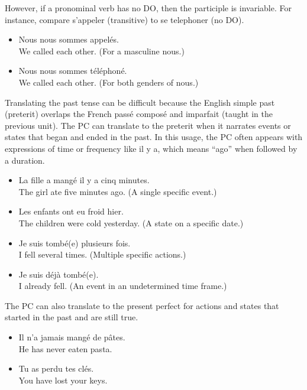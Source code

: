 However, if a pronominal verb has no DO, then the participle is invariable. For instance, compare s'appeler (transitive) to se telephoner (no DO).

\begin{itemize}
  \item  Nous nous sommes appel{\'e}s. \\ We called each other. (For a masculine nous.)
	\item  Nous nous sommes t{\'e}l{\'e}phon{\'e}. \\ We called each other. (For both genders of nous.)
\end{itemize}

Translating the past tense can be difficult because the English simple past (preterit) overlaps the French pass{\'e} compos{\'e} and imparfait (taught in the previous unit). The PC can translate to the preterit when it narrates events or states that began and ended in the past. In this usage, the PC often appears with expressions of time or frequency like il y a, which means ``ago'' when followed by a duration.

\begin{itemize}
  \item  La fille a mang{\'e} il y a cinq minutes. \\ The girl ate five minutes ago. (A single specific event.)
	\item  Les enfants ont eu froid hier. \\ The children were cold yesterday. (A state on a specific date.)
	\item  Je suis tomb{\'e}(e) plusieurs fois. \\ I fell several times. (Multiple specific actions.)
	\item  Je suis d{\'e}j{\`a} tomb{\'e}(e). \\ I already fell. (An event in an undetermined time frame.)
\end{itemize}

The PC can also translate to the present perfect for actions and states that started in the past and are still true.

\begin{itemize}
  \item  Il n'a jamais mang{\'e} de p{\^a}tes. \\ He has never eaten pasta.
	\item  Tu as perdu tes cl{\'e}s. \\ You have lost your keys.
\end{itemize}

